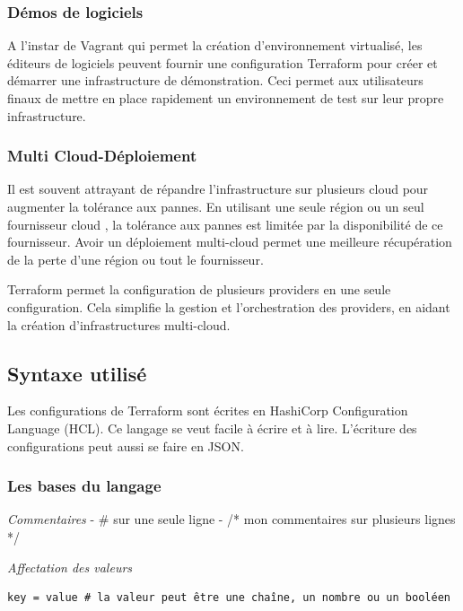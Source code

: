 \documentclass[]{article}
\begin{document}
\subsubsection{Démos de logiciels}\label{duxe9mos-de-logiciels}

A l'instar de Vagrant qui permet la création d'environnement virtualisé,
les éditeurs de logiciels peuvent fournir une configuration Terraform
pour créer et démarrer une infrastructure de démonstration. Ceci permet
aux utilisateurs finaux de mettre en place rapidement un environnement
de test sur leur propre infrastructure.

\subsubsection{Multi
Cloud-Déploiement}\label{multi-cloud-duxe9ploiement}

Il est souvent attrayant de répandre l'infrastructure sur plusieurs
cloud pour augmenter la tolérance aux pannes. En utilisant une seule
région ou un seul fournisseur cloud , la tolérance aux pannes est
limitée par la disponibilité de ce fournisseur. Avoir un déploiement
multi-cloud permet une meilleure récupération de la perte d'une région
ou tout le fournisseur.

Terraform permet la configuration de plusieurs providers en une seule
configuration. Cela simplifie la gestion et l'orchestration des
providers, en aidant la création d'infrastructures multi-cloud.

\subsection{Syntaxe utilisé}\label{syntaxe-utilisuxe9}

Les configurations de Terraform sont écrites en HashiCorp Configuration
Language (HCL). Ce langage se veut facile à écrire et à lire. L'écriture
des configurations peut aussi se faire en JSON.

\subsubsection{Les bases du langage}\label{les-bases-du-langage}

\emph{Commentaires} - \# sur une seule ligne - /* mon commentaires sur
plusieurs lignes */

\emph{Affectation des valeurs}

\begin{verbatim}
key = value # la valeur peut être une chaîne, un nombre ou un booléen
\end{verbatim}
\end{document}
